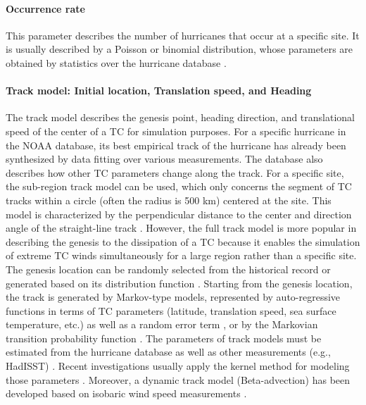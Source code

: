 \paragraph{Occurrence rate} This parameter describes the number of hurricanes that occur at a specific site. It is usually described by a Poisson or binomial distribution, whose parameters are obtained by statistics over the hurricane database \citep{li2016typhoon, vickery2009hurricane-c}.

\paragraph{Track model: Initial location, Translation speed, and Heading} The track model describes the genesis point, heading direction, and translational speed of the center of a TC for simulation purposes. For a specific hurricane in the NOAA database, its best empirical track of the hurricane has already been synthesized by data fitting over various measurements. The database also describes how other TC parameters change along the track. For a specific site, the sub-region track model can be used, which only concerns the segment of TC tracks within a circle (often the radius is 500 km) centered at the site. This model is characterized by the perpendicular distance to the center and direction angle of the straight-line track \citep{georgiou1986design, xiao2011typhoon}. However, the full track model is more popular in describing the genesis to the dissipation of a TC because it enables the simulation of extreme TC winds simultaneously for a large region rather than a specific site. The genesis location can be randomly selected from the historical record or generated based on its distribution function \citep{vickery2009hurricane-c}. Starting from the genesis location, the track is generated by Markov-type models, represented by auto-regressive functions in terms of TC parameters (latitude, translation speed, sea surface temperature, etc.) as well as a random error term \citep{vickery2000simulation}, or by the Markovian transition probability function \citep{emanuel2006statistical}. The parameters of track models must be estimated from the hurricane database as well as other measurements (e.g., HadISST) \citep{li2016typhoon, liu2014projections, vickery2000simulation}. Recent investigations usually apply the kernel method for modeling those parameters \citep{chen2018statistical, mudd2015advancements}. Moreover, a dynamic track model (Beta-advection) has been developed based on isobaric wind speed measurements \citep{emanuel2006statistical}. 

